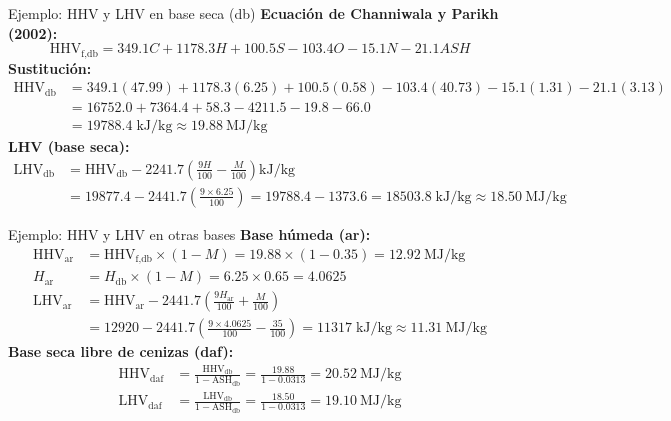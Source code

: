 \documentclass[main.tex]{subfiles}
\begin{document}
\begin{frame}{Ejemplo: HHV y LHV en base seca (db)}
\small
\textbf{Ecuación de Channiwala y Parikh (2002):}
{ \[
\text{HHV}_{\text{f,db}} = 349.1 C + 1178.3 H + 100.5 S - 103.4 O - 15.1 N - 21.1 ASH
\]}
\textbf{Sustitución:}
{
\begin{align*}
\text{HHV}_{\text{db}} &= 349.1(47.99) + 1178.3(6.25) + 100.5(0.58) - 103.4(40.73) - 15.1(1.31) - 21.1(3.13) \\
&= \num{16752.0} + \num{7364.4} + \num{58.3} - \num{4211.5} - \num{19.8} - \num{66.0} \\
&= \num{19788.4} \; \si{\kilo\joule\per\kilogram} \approx \SI{19.88}{\mega\joule\per\kilogram}
\end{align*}}
\textbf{LHV (base seca):}
{
\begin{align*}
\text{LHV}_{\text{db}} &= \text{HHV}_{\text{db}} - 2241.7 \left(\frac{9H}{100} -\frac{M}{100}\right) \si{\kilo\joule\per\kilogram} \\
&= \num{19877.4} - 2441.7 \left(\frac{9 \times 6.25}{100}\right) = \num{19788.4} - 1373.6 = \num{18503.8} \; \si{\kilo\joule\per\kilogram} \approx \SI{18.50}{\mega\joule\per\kilogram}
\end{align*}}
\end{frame}

\begin{frame}{Ejemplo: HHV y LHV en otras bases}
\textbf{Base húmeda (ar):}
\begin{align*}
\text{HHV}_{\text{ar}} &= \text{HHV}_{\text{f,db}} \times (1 - M) = \num{19.88} \times (1 - 0.35) = \SI{12.92}{\mega\joule\per\kilogram} \\
H_{\text{ar}} &= H_{\text{db}} \times (1-M) = 6.25 \times 0.65 = 4.0625 \\
\text{LHV}_{\text{ar}} &= \text{HHV}_{\text{ar}} - 2441.7 \left(\frac{9H_{\text{ar}}}{100} + \frac{M}{100}\right) \\
&= \num{12920} - 2441.7 \left(\frac{9\times 4.0625}{100} -\frac{35}{100}\right) = \num{11317} \; \si{\kilo\joule\per\kilogram} \approx \SI{11.31}{\mega\joule\per\kilogram}
\end{align*}
\textbf{Base seca libre de cenizas (daf):}
\begin{align*}
\text{HHV}_{\text{daf}} &= \frac{\text{HHV}_{\text{db}}}{1 - \text{ASH}_{\text{db}}} = \frac{\num{19.88}}{1 - 0.0313} = \SI{20.52}{\mega\joule\per\kilogram} \\
\text{LHV}_{\text{daf}} &= \frac{\text{LHV}_{\text{db}}}{1 - \text{ASH}_{\text{db}}} = \frac{\num{18.50}}{1 - 0.0313} = \SI{19.10}{\mega\joule\per\kilogram}
\end{align*}
\end{frame}
\end{document}
